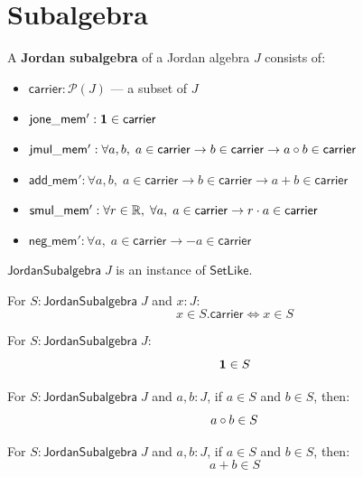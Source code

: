 \section{Subalgebra}

\begin{definition}[JordanSubalgebra]
A \textbf{Jordan subalgebra} of a Jordan algebra $J$ consists of:
\begin{itemize}
  \item $\mathsf{carrier} : \mathcal{P}(J)$ --- a subset of $J$
  \item $\mathsf{jone\_mem'} : \mathbf{1} \in \mathsf{carrier}$
  \item $\mathsf{jmul\_mem'} : \forall a, b,\; a \in \mathsf{carrier} \to b \in \mathsf{carrier} \to a \circ b \in \mathsf{carrier}$
  \item $\mathsf{add\_mem'} : \forall a, b,\; a \in \mathsf{carrier} \to b \in \mathsf{carrier} \to a + b \in \mathsf{carrier}$
  \item $\mathsf{smul\_mem'} : \forall r \in \mathbb{R},\; \forall a,\; a \in \mathsf{carrier} \to r \cdot a \in \mathsf{carrier}$
  \item $\mathsf{neg\_mem'} : \forall a,\; a \in \mathsf{carrier} \to -a \in \mathsf{carrier}$
\end{itemize}
\end{definition}

\begin{proposition}
$\mathsf{JordanSubalgebra}\;J$ is an instance of $\mathsf{SetLike}$.
\end{proposition}

\begin{lemma}
For $S : \mathsf{JordanSubalgebra}\;J$ and $x : J$:
\[ x \in S.\mathsf{carrier} \iff x \in S \]
\end{lemma}

\begin{theorem}
For $S : \mathsf{JordanSubalgebra}\;J$:
\[ \mathbf{1} \in S \]
\end{theorem}

\begin{theorem}
For $S : \mathsf{JordanSubalgebra}\;J$ and $a, b : J$, if $a \in S$ and $b \in S$, then:
\[ a \circ b \in S \]
\end{theorem}

\begin{theorem}
For $S : \mathsf{JordanSubalgebra}\;J$ and $a, b : J$, if $a \in S$ and $b \in S$, then:
\[ a + b \in S \]
\end{theorem}

